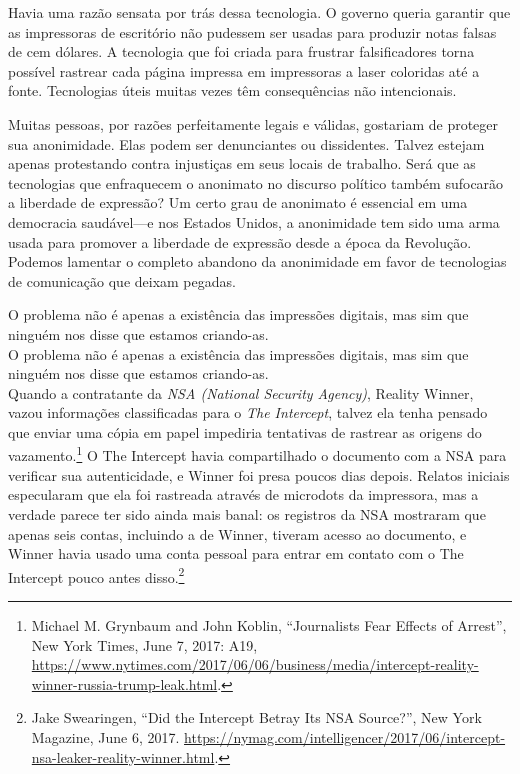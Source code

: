 \documentclass{book}
\newcommand{\ingles}[1]{\textit{#1}}
\begin{document}
Havia uma razão sensata por trás dessa tecnologia. O governo queria garantir que
as impressoras de escritório não pudessem ser usadas para produzir notas falsas
de cem dólares. A tecnologia que foi criada para frustrar falsificadores torna
possível rastrear cada página impressa em impressoras a laser coloridas até a
fonte. Tecnologias úteis muitas vezes têm consequências não intencionais.

Muitas pessoas, por razões perfeitamente legais e válidas, gostariam de proteger
sua anonimidade. Elas podem ser denunciantes ou dissidentes. Talvez estejam
apenas protestando contra injustiças em seus locais de trabalho. Será que as
tecnologias que enfraquecem o anonimato no discurso político também sufocarão a
liberdade de expressão? Um certo grau de anonimato é essencial em uma democracia
saudável---e nos Estados Unidos, a anonimidade tem sido uma arma usada para
promover a liberdade de expressão desde a época da Revolução. Podemos lamentar o
completo abandono da anonimidade em favor de tecnologias de comunicação que deixam
pegadas.

O problema não é apenas a existência das impressões digitais, mas sim que ninguém
nos disse que estamos criando-as.\\

O problema não é apenas a existência das impressões digitais, mas sim que ninguém
nos disse que estamos criando-as.\\

Quando a contratante da \ingles{NSA (National Security Agency)}, Reality Winner,
vazou informações classificadas para o \ingles{The Intercept}, talvez ela tenha
pensado que enviar uma cópia em papel impediria tentativas de rastrear as origens
do vazamento.\footnote{Michael M. Grynbaum and John Koblin, ``Journalists Fear
Effects of Arrest'', New York Times, June 7, 2017: A19,
\url{https://www.nytimes.com/2017/06/06/business/media/intercept-reality-winner-russia-trump-leak.html}.} 
O The Intercept havia compartilhado o documento com a NSA para
verificar sua autenticidade, e Winner foi presa poucos dias depois. Relatos
iniciais especularam que ela foi rastreada através de microdots da impressora,
mas a verdade parece ter sido ainda mais banal: os registros da NSA mostraram
que apenas seis contas, incluindo a de Winner, tiveram acesso ao documento,
e Winner havia usado uma conta pessoal para entrar em contato com o The
Intercept pouco antes disso.\footnote{Jake Swearingen, ``Did the Intercept
Betray Its NSA Source?'', New York Magazine, June 6, 2017.
\url{https://nymag.com/intelligencer/2017/06/intercept-nsa-leaker-reality-winner.html}.}
\end{document}
